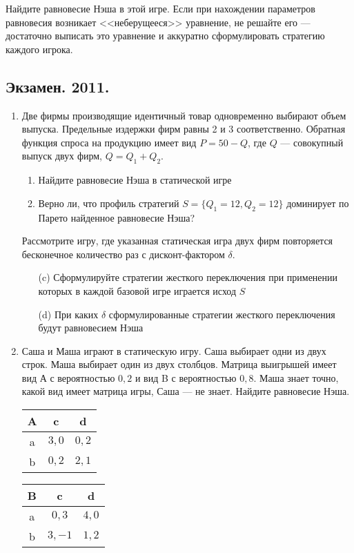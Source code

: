 \documentclass[pdftex,12pt,a4paper]{article}
\begin{document}
\begin{enumerate}
Найдите равновесие Нэша в этой игре. Если при нахождении параметров равновесия возникает <<неберущееся>> уравнение, не решайте его --- достаточно выписать это уравнение и аккуратно сформулировать стратегию каждого игрока.


\end{enumerate}


\subsection{Экзамен. 2011.} 

\begin{enumerate}
\item Две фирмы производящие идентичный товар одновременно выбирают объем выпуска. Предельные издержки фирм равны 2 и 3 соответственно. Обратная функция спроса на продукцию имеет вид $P=50-Q$, где $Q$ --- совокупный выпуск двух фирм, $Q=Q_1+Q_2$.
\begin{enumerate}
\item Найдите равновесие Нэша в статической игре
\item Верно ли, что профиль стратегий $S=\{Q_1=12,Q_2=12\}$ доминирует по Парето найденное равновесие Нэша?
\end{enumerate}
Рассмотрите игру, где указанная статическая игра двух фирм повторяется бесконечное количество раз с дисконт-фактором $\delta$. 
\begin{enumerate}
\item[(c)] Сформулируйте стратегии жесткого переключения при применении которых в каждой базовой игре играется исход $S$
\item[(d)] При каких $\delta$ сформулированные стратегии жесткого переключения будут равновесием Нэша
\end{enumerate}


\item Саша и Маша играют в статическую игру. Саша выбирает одни из двух строк. Маша выбирает один из двух столбцов. Матрица выигрышей имеет вид А с вероятностью $0{,}2$ и вид B с вероятностью $0{,}8$. Маша знает точно, какой вид имеет матрица игры, Саша --- не знает. Найдите равновесие Нэша.


\begin{tabular}{c|cc}
A & c & d \\ 
\hline 
a & $3,0$ & $0,2$ \\ 
b & $0,2$ & $2,1$ \\ 
\end{tabular} 


\begin{tabular}{c|cc}
B & c & d \\ 
\hline 
a & $0,3$ & $4,0$ \\ 
b & $3,-1$ & $1,2$ \\ 
\end{tabular} 




\end{enumerate}
\end{document}
